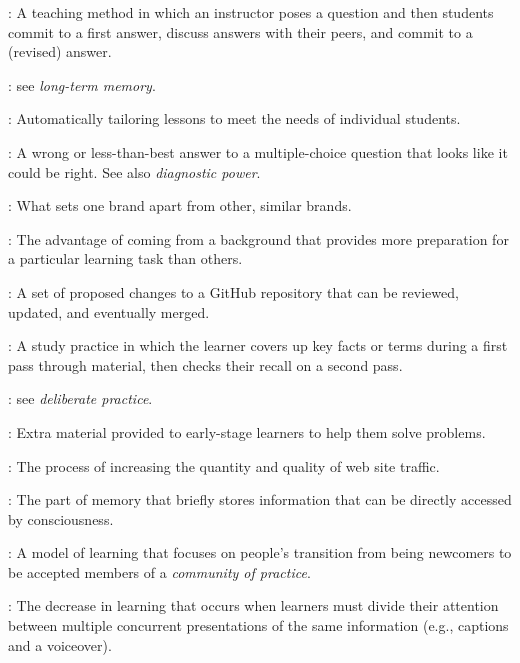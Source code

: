 \begin{description}
: A teaching method in
which an instructor poses a question and then students commit to a first
answer, discuss answers with their peers, and commit to a (revised)
answer.

: see \emph{long-term
memory}.

:
Automatically tailoring lessons to meet the needs of individual
students.

: A wrong or
less-than-best answer to a multiple-choice question that looks like it
could be right. See also \emph{diagnostic power}.

: What sets one brand apart from
other, similar brands.

: The
advantage of coming from a background that provides more preparation for
a particular learning task than others.

: A set of proposed changes to
a GitHub repository that can be reviewed, updated, and eventually
merged.

: A study
practice in which the learner covers up key facts or terms during a
first pass through material, then checks their recall on a second pass.

: see \emph{deliberate
practice}.

: Extra material provided to
early-stage learners to help them solve problems.

: The process of increasing
the quantity and quality of web site traffic.

: The part of memory
that briefly stores information that can be directly accessed by
consciousness.

: A model of learning
that focuses on people's transition from being newcomers to be accepted
members of a \emph{community of practice}.

: The
decrease in learning that occurs when learners must divide their
attention between multiple concurrent presentations of the same
information (e.g., captions and a voiceover).


\end{description}

